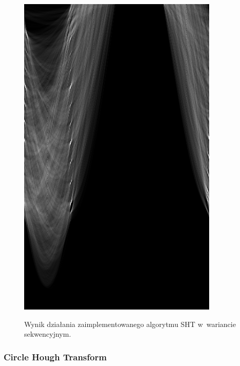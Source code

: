 \begin{figure}
\begin{minipage}[c]{.475\linewidth}
{      }%
      \end{minipage}%
  \hfill
  \begin{minipage}[c]{.475\linewidth}
      {
        \includegraphics[width=\linewidth]{img/sht/equantial_acc.png}
      }%
  \end{minipage}%
  \caption{Wynik działania zaimplementowanego algorytmu SHT w~wariancie sekwencyjnym.}
  \label{fig:sht}
\end{figure}

\subsubsection{Circle Hough Transform}

